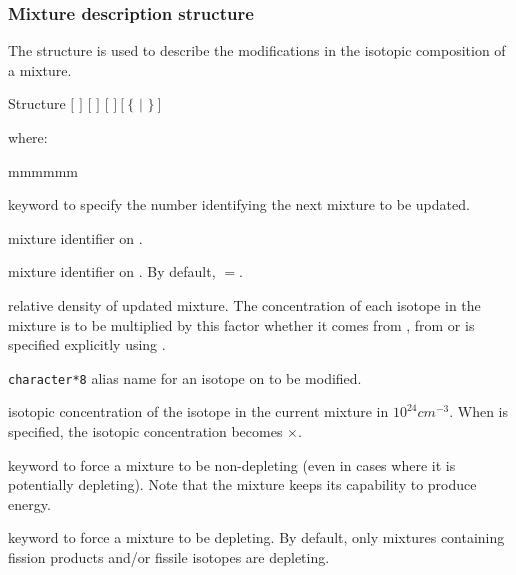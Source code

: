 \vskip 0.25cm
\goodbreak

\subsubsection{Mixture description structure}\label{sect:descmix2}

The structure  is used to describe the modifications in the isotopic composition of a mixture.

\begin{DataStructure}{Structure }
   $[$  $]$ $[$  $]$
$[$   $]~[~\{$  $|$  $\}~]$
\end{DataStructure}

\vspace{-0.15cm}

\noindent
where:

\begin{ListeDeDescription}{mmmmmm}

\item[\moc{MIX}] keyword to specify the number identifying the next mixture to
be updated.

\item[\dusa{matnum}] mixture identifier on . 

\item[\dusa{matold}] mixture identifier on . By default, $=$.

\item[\dusa{relden}] relative density of updated mixture. The  concentration
of each isotope in the mixture is to be multiplied by this factor whether it 
comes from , from  or is
specified explicitly using . 

\item[\dusa{NAMALI}] {\tt character*8} alias name for an isotope on
 to be modified. 

\item[\dusa{dens}] isotopic concentration of the isotope  in the
current mixture in $10^{24}cm^{-3}$.  When  is specified, the
isotopic concentration becomes $\times$.

\item[\moc{NOEV}] keyword to force a mixture to be non-depleting (even in
cases where it is potentially depleting). Note that the mixture keeps its
capability to produce energy.

\item[\moc{EVOL}] keyword to force a mixture to be depleting. By default, only
mixtures containing fission products and/or fissile isotopes are depleting.

\end{ListeDeDescription}


